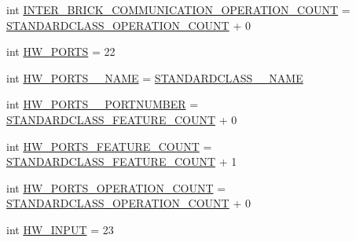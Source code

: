 \begin{DoxyCompactItemize}
\item 
int \hyperlink{interfaceshootingmachineemfmodel_1_1_shootingmachineemfmodel_package_afd388b80427475bafc3ae00abc93859e}{I\-N\-T\-E\-R\-\_\-\-B\-R\-I\-C\-K\-\_\-\-C\-O\-M\-M\-U\-N\-I\-C\-A\-T\-I\-O\-N\-\_\-\-O\-P\-E\-R\-A\-T\-I\-O\-N\-\_\-\-C\-O\-U\-N\-T} = \hyperlink{interfaceshootingmachineemfmodel_1_1_shootingmachineemfmodel_package_a2fe5d848cfe0a02fe5609e2c5ed7e7c7}{S\-T\-A\-N\-D\-A\-R\-D\-C\-L\-A\-S\-S\-\_\-\-O\-P\-E\-R\-A\-T\-I\-O\-N\-\_\-\-C\-O\-U\-N\-T} + 0
\item 
int \hyperlink{interfaceshootingmachineemfmodel_1_1_shootingmachineemfmodel_package_afa74b06d8a28f085369fdcb2b19b7b36}{H\-W\-\_\-\-P\-O\-R\-T\-S} = 22
\item 
int \hyperlink{interfaceshootingmachineemfmodel_1_1_shootingmachineemfmodel_package_a8c7830b95625a0ce6a38f99f0bbb4a6f}{H\-W\-\_\-\-P\-O\-R\-T\-S\-\_\-\-\_\-\-N\-A\-M\-E} = \hyperlink{interfaceshootingmachineemfmodel_1_1_shootingmachineemfmodel_package_a06475d7d54d52ee19b2aaf4d5d73c738}{S\-T\-A\-N\-D\-A\-R\-D\-C\-L\-A\-S\-S\-\_\-\-\_\-\-N\-A\-M\-E}
\item 
int \hyperlink{interfaceshootingmachineemfmodel_1_1_shootingmachineemfmodel_package_af1a55b03e332449551c73de215f7cbbf}{H\-W\-\_\-\-P\-O\-R\-T\-S\-\_\-\-\_\-\-P\-O\-R\-T\-N\-U\-M\-B\-E\-R} = \hyperlink{interfaceshootingmachineemfmodel_1_1_shootingmachineemfmodel_package_a14037f66989b3107e402142df96ee9aa}{S\-T\-A\-N\-D\-A\-R\-D\-C\-L\-A\-S\-S\-\_\-\-F\-E\-A\-T\-U\-R\-E\-\_\-\-C\-O\-U\-N\-T} + 0
\item 
int \hyperlink{interfaceshootingmachineemfmodel_1_1_shootingmachineemfmodel_package_a07e6faf7371ad8351da3b4600954f204}{H\-W\-\_\-\-P\-O\-R\-T\-S\-\_\-\-F\-E\-A\-T\-U\-R\-E\-\_\-\-C\-O\-U\-N\-T} = \hyperlink{interfaceshootingmachineemfmodel_1_1_shootingmachineemfmodel_package_a14037f66989b3107e402142df96ee9aa}{S\-T\-A\-N\-D\-A\-R\-D\-C\-L\-A\-S\-S\-\_\-\-F\-E\-A\-T\-U\-R\-E\-\_\-\-C\-O\-U\-N\-T} + 1
\item 
int \hyperlink{interfaceshootingmachineemfmodel_1_1_shootingmachineemfmodel_package_a5f85f99a2b80ea1b9f8c81dc620e69b3}{H\-W\-\_\-\-P\-O\-R\-T\-S\-\_\-\-O\-P\-E\-R\-A\-T\-I\-O\-N\-\_\-\-C\-O\-U\-N\-T} = \hyperlink{interfaceshootingmachineemfmodel_1_1_shootingmachineemfmodel_package_a2fe5d848cfe0a02fe5609e2c5ed7e7c7}{S\-T\-A\-N\-D\-A\-R\-D\-C\-L\-A\-S\-S\-\_\-\-O\-P\-E\-R\-A\-T\-I\-O\-N\-\_\-\-C\-O\-U\-N\-T} + 0
\item 
int \hyperlink{interfaceshootingmachineemfmodel_1_1_shootingmachineemfmodel_package_ac939588ce4eb2f893f81c08e82d43c06}{H\-W\-\_\-\-I\-N\-P\-U\-T} = 23

\end{DoxyCompactItemize}

